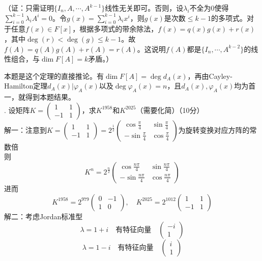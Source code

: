 \documentclass[UTF8]{ctexart}
\begin{document}
		（证：只需证明$\{I_n, A, \cdots, A^{k-1}\}$线性无关即可。否则，设$\lambda_i$不全为0使得$\sum_{i=0}^{k-1} \lambda_i A^i = 0$。令$g(x) = \sum_{i=0}^{k-1} \lambda_i x^i$，则$g(x)$是次数$\leq k - 1$的多项式。对于任意$f(x) \in F[x]$，根据多项式的带余除法，$f(x) = q(x) g(x) + r(x)$，其中$\deg(r) < \deg(g) \leq k - 1$。故$f(A) = q(A) g(A) + r(A) = r(A)$。这说明$f(A)$都是$\{I_n, \cdots, A^{k-2}\}$的线性组合，与$\dim F[A] = k$矛盾。）
		
		本题是这个定理的直接推论。有$\dim F[A] = \deg d_A(x)$，再由Cayley-Hamilton定理$d_A(x) |\varphi_A(x)$以及$\deg \varphi_A(x) = n$，且$d_A(x), \varphi_A(x)$均为首一，就得到本题结果。\\
		
. 设矩阵$K = \begin{pmatrix} 1 & 1 \\ -1 & 1 \end{pmatrix}$，求$K^{1958}$和$K^{2025}$（需要化简）（10分）\\
解一：注意到$K = \begin{pmatrix} 1 & 1 \\ -1 & 1 \end{pmatrix} = 2^{\frac{1}{2}} \begin{pmatrix} \cos{\frac{\pi}{4}} & \sin{\frac{\pi}{4}} \\ -\sin{\frac{\pi}{4}} & \cos{\frac{\pi}{4}} \end{pmatrix}$为旋转变换对应方阵的常数倍\\
则
		\[
 K^n = 2^{\frac{n}{2}} \begin{pmatrix} \cos{\frac{n\pi}{4}} & \sin{\frac{n\pi}{4}} \\ -\sin{\frac{n\pi}{4}} & \cos{\frac{n\pi}{4}} \end{pmatrix}
		\]
进而
		\[
	 K^{1958} = 2^{979} \begin{pmatrix} 0 & -1 \\ 1 & 0 \end{pmatrix}, \quad K^{2025} = 2^{1012} \begin{pmatrix} 1 & 1 \\ -1 & 1 \end{pmatrix}
		\]
解二：考虑Jordan标准型
		\[
		\lambda = 1 + i \quad \text{有特征向量} \quad \begin{pmatrix} -i \\ 1 \end{pmatrix}
		\]
		\[
		\lambda = 1 - i \quad \text{有特征向量} \quad \begin{pmatrix} i \\ 1 \end{pmatrix}
		\]
\end{document}

